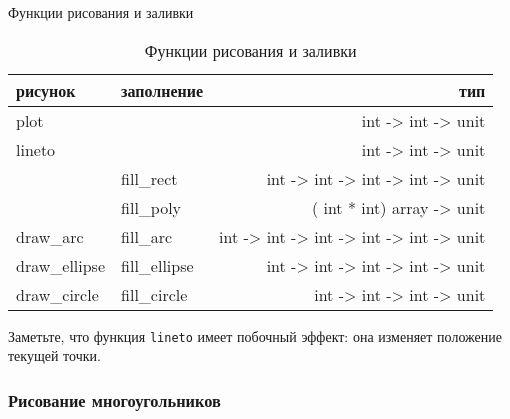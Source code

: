 Функции рисования и заливки
\begin{table}[hl]
	\begin{center}
	\caption{\label{tbl:drawing_and_filling_functions} Функции рисования и
заливки}
	\begin{tabular}{|l|l|r|}
		\hline
		рисунок & заполнение & тип \\
		\hline
		plot & & int -> int -> unit \\
		\hline
		lineto & & int -> int -> unit \\
		\hline
		& fill\_rect & int -> int -> int -> int -> unit \\
		\hline
		& fill\_poly & ( int * int) array -> unit \\
		\hline
		draw\_arc & fill\_arc & int -> int -> int -> int -> int -> unit \\
		\hline
		draw\_ellipse & fill\_ellipse & int -> int -> int -> int -> unit \\
		\hline
		draw\_circle & fill\_circle & int -> int -> int -> unit \\
		\hline
	\end{tabular}
	\end{center}
\end{table}

Заметьте, что функция \texttt{lineto} имеет побочный эффект: она изменяет
положение текущей точки.

\subsubsection{Рисование многоугольников}